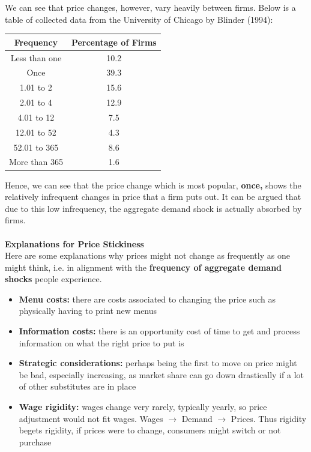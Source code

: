 \documentclass[12pt, letterpaper]{article}
\begin{document}
We can see that price changes, however, vary heavily between firms. Below is a table of collected data from the University of Chicago by Blinder (1994):
\begin{center}
	\begin{tabular}{c c}
		Frequency & Percentage of Firms\\
		\hline
		Less than one & 10.2\\
		Once & 39.3\\
		1.01 to 2 & 15.6\\
		2.01 to 4 & 12.9\\
		4.01 to 12 & 7.5\\
		12.01 to 52 & 4.3\\
		52.01 to 365 & 8.6\\
		More than 365 & 1.6\\
		\hline
	\end{tabular}
\end{center}
Hence, we can see that the price change which is most popular, \textbf{once,} shows the relatively infrequent changes in price that a firm puts out. It can be argued that due to this low infrequency, the aggregate demand shock is actually absorbed by firms. \\\\
\textbf{Explanations for Price Stickiness}\\
Here are some explanations why prices might not change as frequently as one might think, i.e. in alignment with the \textbf{frequency of aggregate demand shocks} people experience.
\begin{itemize}
	\item \textbf{Menu costs:} there are costs associated to changing the price such as physically having to print new menus
	\item \textbf{Information costs:} there is an opportunity cost of time to get and process information on what the right price to put is
	\item \textbf{Strategic considerations:} perhaps being the first to move on price might be bad, especially increasing, as market share can go down drastically if a lot of other substitutes are in place
	\item \textbf{Wage rigidity:} wages change very rarely, typically yearly, so price adjustment would not fit wages. Wages $\rightarrow$ Demand $\rightarrow$ Prices. Thus rigidity begets rigidity, if prices were to change, consumers might switch or not purchase
\end{itemize}
\end{document}
